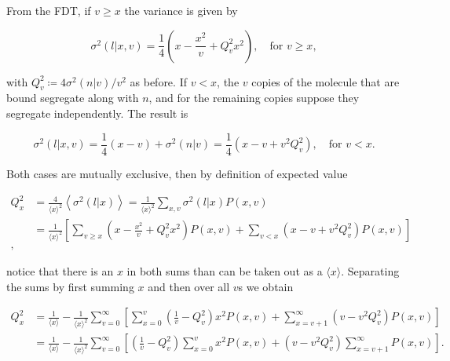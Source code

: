 From the FDT, if $v\geq x$ the variance is given by

\begin{equation*}
  \sigma^2(l|x,v) =\frac{1}{4}\left(x-\frac{x^2}{v}+Q_v^2x^2\right),\quad \text{for } v\geq x,
\end{equation*}

with $Q_v^2 \coloneqq 4\sigma^2(n|v)/v^2$ as before. If $v<x$, the $v$ copies of the molecule that are bound segregate along with $n$, and for the remaining copies suppose they segregate independently. The result is

\begin{equation*}
  \sigma^2(l|x,v) = \frac{1}{4}(x-v) + \sigma^2(n|v) = \frac{1}{4}\left(x-v+v^2Q_v^2\right),\quad \text{for } v<x.
\end{equation*}

Both cases are mutually exclusive, then by definition of expected value

\begin{equation*}
  \begin{split}
    Q_x^2 &= \frac{4}{\langle x\rangle^2}\left\langle\sigma^2(l|x)\right\rangle = \frac{1}{\langle x\rangle^2}\sum_{x,v}\sigma^2(l|x)P(x,v)\\
    &=\frac{1}{\langle x\rangle^2}\left[\sum_{v\geq x}\left(x-\frac{x^2}{v}+Q_v^2x^2\right)P(x,v) + \sum_{v<x}\left(x-v+v^2Q_v^2\right)P(x,v)\right]\\,
  \end{split}
\end{equation*}

notice that there is an $x$ in both sums than can be taken out as a $\langle x\rangle$. Separating the sums by first summing $x$ and then over all $v$s we obtain

\begin{equation*}
  \begin{split}
     Q_x^2 &= \frac{1}{\langle x\rangle} - \frac{1}{\langle x\rangle^2}\sum_{v=0}^\infty\left[\sum_{x=0}^v\left(\frac{1}{v}-Q_v^2\right)x^2P(x,v)+\sum_{x=v+1}^\infty\left(v-v^2Q_v^2\right)P(x,v)\right]\\
     &=\frac{1}{\langle x\rangle} - \frac{1}{\langle x\rangle^2}\sum_{v=0}^\infty\left[\left(\frac{1}{v}-Q_v^2\right)\sum_{x=0}^vx^2P(x,v)+\left(v-v^2Q_v^2\right)\sum_{x=v+1}^\infty P(x,v)\right].
  \end{split}
\end{equation*}


